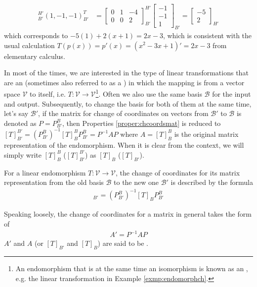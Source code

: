 \begin{solution}
\begin{align*}
[T]_{B'}^{H'} (1,-1,-1)^T_{B'} &= 
\begin{bmatrix}
0 & 1 & -4 \\
0 & 0 & 2
\end{bmatrix}_{B'}^{H'}
\begin{bmatrix}
-1 \\
-1 \\
1
\end{bmatrix}_{B'}
=
\begin{bmatrix}
-5 \\
2
\end{bmatrix}_{H'}
\end{align*}
which corresponds to $-5(1) + 2(x+1) = 2x-3$, which is consistent with the usual calculation $T(p(x)) = p'(x) = (x^2-3x+1)' = 2x-3$ from elementary calculus.
\end{solution}

In most of the times, we are interested in the type of linear transformations that are an  (sometimes also referred to as a ) in which the mapping is from a vector space $\mathcal{V}$ to itself, i.e. $T: \mathcal{V} \to \mathcal{V}$\footnote{An endomorphism that is at the same time an isomorphism is known as an , e.g. the linear transformation in Example \ref{exmp:endomorphch}.}. Often we also use the same basis $\mathcal{B}$ for the input and output. Subsequently, to change the basis for both of them at the same time, let's say $\mathcal{B}'$, if the matrix for change of coordinates on vectors from $\mathcal{B}'$ to $\mathcal{B}$ is denoted as $P = P_{B'}^B$, then Properties \ref{proper:chcoordsmat} is reduced to $[T]_{B'}^{B'} = (P_{B'}^B)^{-1} [T]_B^B P_{B'}^B = P^{-1}AP$ where $A = [T]_B^B$ is the original matrix representation of the endomorphism. When it is clear from the context, we will simply write $[T]_B^B$ ($[T]_{B'}^{B'}$) as $[T]_B$ ($[T]_{B'}$).
\begin{proper}
\label{proper:endomorph}
For a linear endomorphism $T: \mathcal{V} \to \mathcal{V}$, the change of coordinates for its matrix representation from the old basis $\mathcal{B}$ to the new one $\mathcal{B}'$ is described by the formula
\begin{align*}
[T]_{B'} = (P_{B'}^B)^{-1} [T]_B P_{B'}^B    
\end{align*}
\end{proper}
Speaking loosely, the change of coordinates for a matrix in general takes the form of
\begin{align*}
A' = P^{-1}AP
\end{align*}
$A'$ and $A$ (or $[T]_{B'}$ and $[T]_B$) are said to be .

